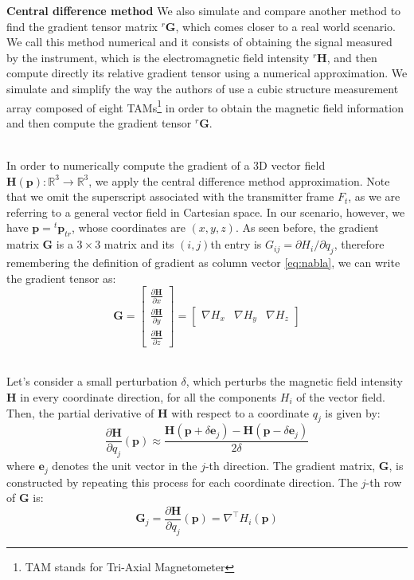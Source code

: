 \documentclass[main]{subfiles}
\begin{document}
\textbf{Central difference method}
We also simulate and compare another method to find the gradient tensor matrix
${}^r \mathbf{G}$, which comes closer to a real world scenario.
We call this method numerical and it consists of obtaining the 
signal measured by the instrument, which is the electromagnetic field intensity
${}^r \mathbf{H}$, and then compute directly its relative gradient tensor using a 
numerical approximation.
We simulate and simplify the way the authors of \cite{NSS_single_localization} use 
a cubic structure measurement array composed of eight
TAMs\footnote{TAM stands for Tri-Axial Magnetometer} in order to obtain the magnetic
field information and then compute the gradient tensor ${}^r \mathbf{G}$.

\noindent\\
In order to numerically compute the gradient of a 3D vector field $ \mathbf{H}( \mathbf{p}): \mathbb{R}^3 \to \mathbb{R}^3$,
we apply the central difference method approximation.
Note that we omit the superscript associated with the transmitter frame \( F_t \), 
as we are referring to a general vector field in Cartesian space. In our scenario, however, 
we have \( \mathbf{p} = {}^t \mathbf{p}_{tr} \), whose coordinates are \( (x, y, z) \).
As seen before, the gradient matrix $ \mathbf{G}$ is a \(3 \times 3\) matrix
and its $(i,j)$th entry is $G_{ij} = \partial H_i / \partial q_j$, therefore
remembering the definition of gradient as column vector \eqref{eq:nabla}, we can write the gradient tensor as:
\begin{equation}
 \mathbf{G} =
\begin{bmatrix}
\frac{\partial \mathbf{H}}{\partial x} \\
\frac{\partial \mathbf{H}}{\partial y} \\
\frac{\partial \mathbf{H}}{\partial z}
\end{bmatrix}
=
\begin{bmatrix}
    \nabla H_x &
    \nabla H_y &
    \nabla H_z
\end{bmatrix}
\end{equation}

\noindent\\
Let's consider a small perturbation $\delta$, which perturbs the magnetic field intensity $\mathbf{H}$ in every 
coordinate direction, for all the components $H_i$ of the vector field. Then, the partial derivative of $\mathbf{H}$ with 
respect to a coordinate \( q_j \) is given by:
\begin{equation}
\frac{\partial \mathbf{H}}{\partial q_j} (\mathbf{p}) \approx \frac{\mathbf{H}(\mathbf{p} + \delta \mathbf{e}_j) 
- \mathbf{H}(\mathbf{p} - \delta \mathbf{e}_j)}{2\delta}
\label{eq:G_num}
\end{equation}
where \( \mathbf{e}_j \) denotes the unit vector in the \( j \)-th direction. The gradient matrix, 
\( \mathbf{G} \), is constructed by repeating this process for each coordinate direction.
The \( j \)-th row of \( \mathbf{G} \) is:
\begin{equation}
\mathbf{G}_j = \frac{\partial \mathbf{H}}{\partial q_j} (\mathbf{p}) = 
\nabla^\top H_i (\mathbf{p})
\label{eq:G_completa}
\end{equation}
\end{document}
